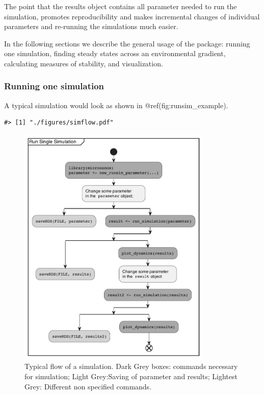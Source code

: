 \documentclass[]{elsarticle} %
\begin{document}
The point that the results object contains all parameter needed to run
the simulation, promotes reproducibility and makes incremental changes
of individual parameters and re-running the simulations much easier.

In the following sections we describe the general usage of the package:
running one simulation, finding steady states across an environmental
gradient, calculating measures of stability, and visualization.

\hypertarget{running-one-simulation}{%
\subsubsection{Running one simulation}\label{running-one-simulation}}

A typical simulation would look as shown in @ref(fig:runsim\_example).

\begin{verbatim}
#> [1] "./figures/simflow.pdf"
\end{verbatim}

\begin{figure}

{\centering \includegraphics[width=350px]{./figures/simflow} 

}

\caption{Typical flow of a simulation. Dark Grey boxes: commands necessary for simulation; Light Grey:Saving of parameter and results; Lightest Grey: Different non specified commands.}\label{fig:runsim_example}
\end{figure}
\end{document}
